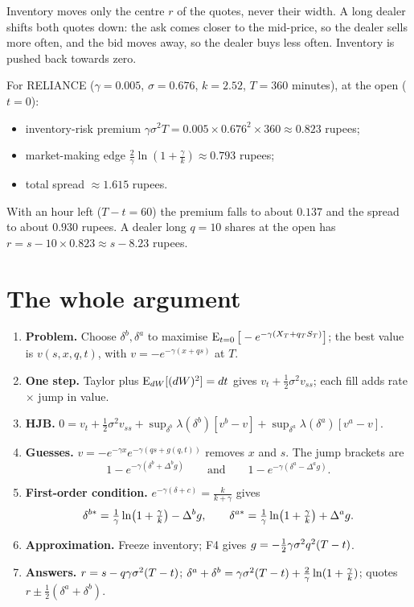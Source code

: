 \begin{intuition}
Inventory moves only the centre $r$ of the quotes, never their width. A long dealer shifts both quotes down: the ask comes closer to the mid-price, so the dealer sells more often, and the bid moves away, so the dealer buys less often. Inventory is pushed back towards zero.
\end{intuition}

\begin{example}
For RELIANCE ($\gamma=0.005$, $\sigma=0.676$, $k=2.52$, $T=360$ minutes), at the open ($t=0$):
\begin{itemize}
  \item inventory-risk premium $\gamma\sigma^2T=0.005\times0.676^2\times360\approx0.823$ rupees;
  \item market-making edge $\frac2\gamma\ln(1+\frac\gamma k)\approx0.793$ rupees;
  \item total spread $\approx1.615$ rupees.
\end{itemize}
With an hour left ($T-t=60$) the premium falls to about $0.137$ and the spread to about $0.930$ rupees. A dealer long $q=10$ shares at the open has $r=s-10\times0.823\approx s-8.23$ rupees.
\end{example}

\clearpage
\section{The whole argument}

\begin{recall}
\begin{enumerate}
  \item \textbf{Problem.} Choose $\delta^b,\delta^a$ to maximise $\operatorname{E}_{t=0}\big[-e^{-\gamma(X_T+q_TS_T)}\big]$; the best value is $v(s,x,q,t)$, with $v=-e^{-\gamma(x+qs)}$ at $T$.
  \item \textbf{One step.} Taylor plus $\operatorname{E}_{dW}[(dW)^2]=dt$ gives $v_t+\frac12\sigma^2v_{ss}$; each fill adds rate $\times$ jump in value.
  \item \textbf{HJB.} $0=v_t+\frac12\sigma^2v_{ss}+\sup_{\delta^b}\lambda(\delta^b)[v^b-v]+\sup_{\delta^a}\lambda(\delta^a)[v^a-v]$.
  \item \textbf{Guesses.} $v=-e^{-\gamma x}e^{-\gamma(qs+g(q,t))}$ removes $x$ and $s$. The jump brackets are
  \[
    1-e^{-\gamma(\delta^b+\Delta^bg)}\qquad\text{and}\qquad 1-e^{-\gamma(\delta^a-\Delta^ag)}.
  \]
  \item \textbf{First-order condition.} $e^{-\gamma(\delta+c)}=\frac{k}{k+\gamma}$ gives
  \[
    \delta^{b*}=\tfrac{1}{\gamma}\ln\!\big(1+\tfrac{\gamma}{k}\big)-\Delta^bg,\qquad \delta^{a*}=\tfrac{1}{\gamma}\ln\!\big(1+\tfrac{\gamma}{k}\big)+\Delta^ag .
  \]
  \item \textbf{Approximation.} Freeze inventory; F4 gives $g=-\frac12\gamma\sigma^2q^2(T-t)$.
  \item \textbf{Answers.} $r=s-q\gamma\sigma^2(T-t)$; $\delta^a+\delta^b=\gamma\sigma^2(T-t)+\frac2\gamma\ln(1+\frac\gamma k)$; quotes $r\pm\frac12(\delta^a+\delta^b)$.
\end{enumerate}
\end{recall}
